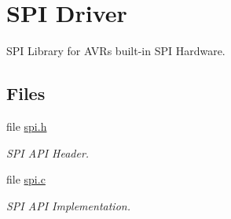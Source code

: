 \hypertarget{group__spi}{\section{S\-P\-I Driver}
\label{group__spi}
}


S\-P\-I Library for A\-V\-Rs built-\/in S\-P\-I Hardware.  


\subsection*{Files}
\begin{DoxyCompactItemize}
\item 
file \hyperlink{spi_8h}{spi.\-h}
\begin{DoxyCompactList}\small\item\em S\-P\-I A\-P\-I Header. \end{DoxyCompactList}\item 
file \hyperlink{spi_8c}{spi.\-c}
\begin{DoxyCompactList}\small\item\em S\-P\-I A\-P\-I Implementation. \end{DoxyCompactList}\end{DoxyCompactItemize}
